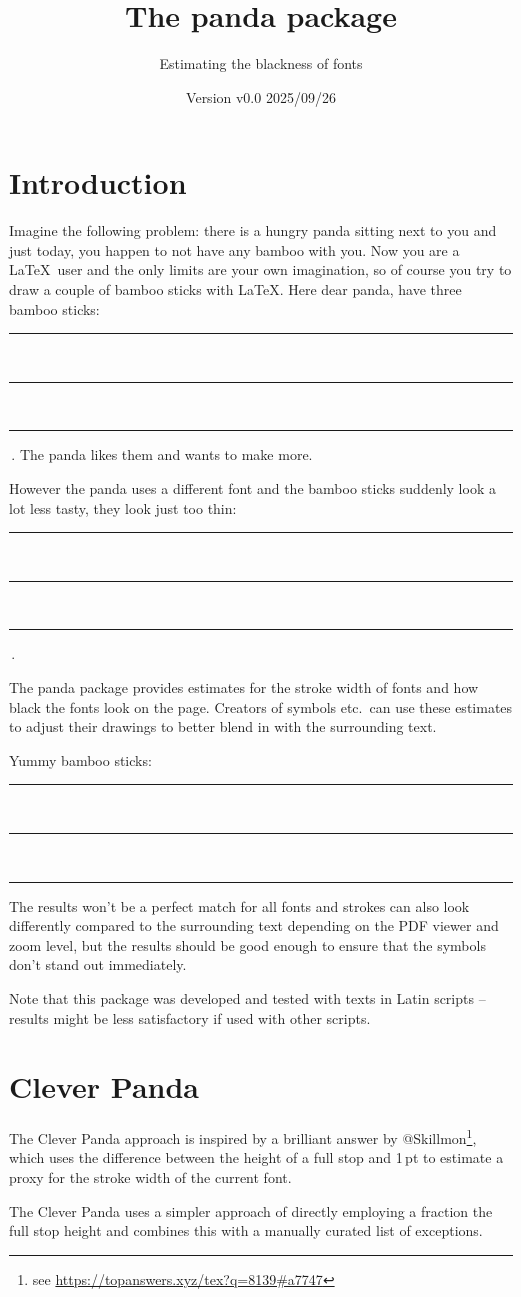 \documentclass{scrartcl}
\title{The panda package}
\subtitle{Estimating the blackness of fonts}
\author{%
  \texorpdfstring{
   \begin{tikzpicture}
     \colorlet{black}{samdgray}
     \panda
   \end{tikzpicture}\\[0.8em]
   \texttt{samcarter}\\
   \url{https://github.com/samcarter/panda}\\
  }{samcarter}}
\date{Version v0.0 \textendash{} 2025/09/26}
\newcommand{\badbamboo}[2]{%
  \rule{#1}{#2}\,\rule{#1}{#2}\,\rule{#1}{#2}%
}
\newcommand{\busybamboo}{%
  \rule{ \BusyPanda{0.125}\fontcharht\font`I }{ \fontcharht\font`I }%
}
\begin{document}
\maketitle

\section{Introduction}
\label{intro}

Imagine the following problem:
there is a hungry panda sitting next to you and just today, you happen to not have any bamboo with you.
Now you are a \LaTeX\ user and the only limits are your own imagination, so of course you try to draw a couple of bamboo sticks with \LaTeX.
Here dear panda, have three bamboo sticks: \badbamboo{0.8pt}{\fontcharht\font`I}\,.
The panda likes them and wants to make more.
{\selectfont However the panda uses a different font and the bamboo sticks suddenly look a lot less tasty, they look just too thin: \badbamboo{0.8pt}{\fontcharht\font`I}\,.}

The panda package provides estimates for the stroke width of fonts and how black the fonts look on the page.
Creators of symbols etc.\ can use these estimates to adjust their drawings to better blend in with the surrounding text.

{\selectfont Yummy bamboo sticks: \busybamboo\,\busybamboo\,\busybamboo}

The results won't be a perfect match for all fonts and strokes can also look differently compared to the surrounding text depending on the PDF viewer and zoom level, but the results should be good enough to ensure that the symbols don't stand out immediately.

Note that this package was developed and tested with texts in Latin scripts -- results might be less satisfactory if used with other scripts.

\blurb*

\section{Clever Panda}

The Clever Panda approach is inspired by a brilliant answer by @Skillmon\footnote{see \url{https://topanswers.xyz/tex?q=8139\#a7747}}, which uses the difference between the height of a full stop and 1\,pt to estimate a proxy for the stroke width of the current font.

The Clever Panda uses a simpler approach of directly employing a fraction the full stop height and combines this with a manually curated list of exceptions.
\end{document}
